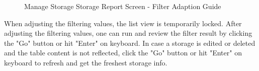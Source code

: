 \begin{figure}[H]
	\centering
    \hspace{5pt}

    \vspace{10pt}
    \caption{Manage Storage Storage Report Screen - Filter Adaption Guide}
	\label{fig:MSstorageReportFilterAdaption}
\end{figure}

When adjusting the filtering values, the list view is temporarily locked. After adjusting the filtering values, one can run and review the filter result by clicking the "Go" button or hit "Enter" on keyboard. In case a storage is edited or deleted and the table content is not reflected, click the "Go" button or hit "Enter" on keyboard to refresh and get the freshest storage info.

